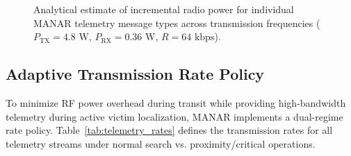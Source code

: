 \begin{figure}[t]
\caption{Analytical estimate of incremental radio power for individual MANAR telemetry message types across transmission frequencies ($P_{\mathrm{TX}} = 4.8\text{ W}$, $P_{\mathrm{RX}} = 0.36\text{ W}$, $R = 64\text{ kbps}$).}
\label{fig:manar_telemetry_power_frequency}
\end{figure}

\subsection{Adaptive Transmission Rate Policy}
To minimize RF power overhead during transit while providing high-bandwidth telemetry during active victim localization, MANAR implements a dual-regime rate policy. Table~\ref{tab:telemetry_rates} defines the transmission rates for all telemetry streams under normal search vs. proximity/critical operations.

